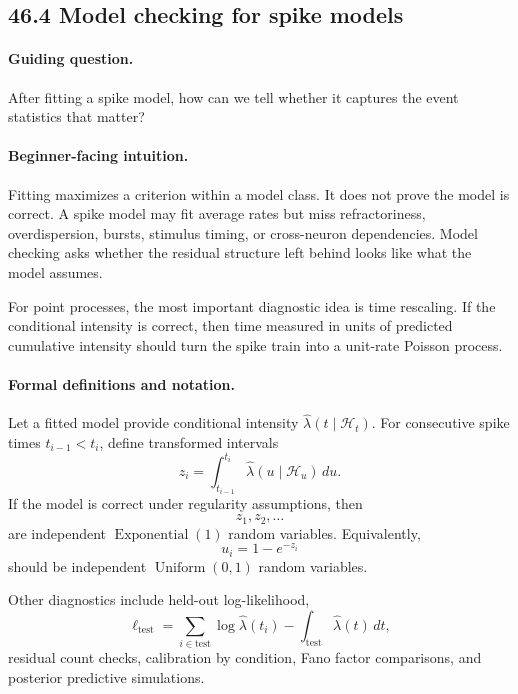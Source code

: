 \subsection{46.4 Model checking for spike models}

\paragraph{Guiding question.}
After fitting a spike model, how can we tell whether it captures the event statistics that matter?

\paragraph{Beginner-facing intuition.}
Fitting maximizes a criterion within a model class. It does not prove the model is correct. A spike model may fit average rates but miss refractoriness, overdispersion, bursts, stimulus timing, or cross-neuron dependencies. Model checking asks whether the residual structure left behind looks like what the model assumes.

For point processes, the most important diagnostic idea is time rescaling. If the conditional intensity is correct, then time measured in units of predicted cumulative intensity should turn the spike train into a unit-rate Poisson process.

\paragraph{Formal definitions and notation.}
Let a fitted model provide conditional intensity \(\hat\lambda(t\mid\mathcal H_t)\). For consecutive spike times \(t_{i-1}<t_i\), define transformed intervals
\[
z_i=\int_{t_{i-1}}^{t_i}\hat\lambda(u\mid\mathcal H_u)\,du.
\]
If the model is correct under regularity assumptions, then
\[
z_1,z_2,\ldots
\]
are independent \(\operatorname{Exponential}(1)\) random variables. Equivalently,
\[
u_i=1-e^{-z_i}
\]
should be independent \(\operatorname{Uniform}(0,1)\) random variables.

Other diagnostics include held-out log-likelihood,
\[
\ell_{\mathrm{test}}=\sum_{i\in\mathrm{test}}\log\hat\lambda(t_i)-\int_{\mathrm{test}}\hat\lambda(t)\,dt,
\]
residual count checks, calibration by condition, Fano factor comparisons, and posterior predictive simulations.

